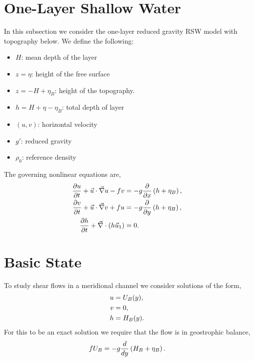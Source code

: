 \documentclass[letterpaper,10pt,english]{sphinxmanual}
\begin{document}
\section{One-Layer Shallow Water}
\label{linear_stability:one-layer-shallow-water}
In this subsection we consider the one-layer reduced gravity RSW model
with topography below. We define the following:
\begin{itemize}
\item {} 
\(H\): mean depth of the layer

\item {} 
\(z=\eta\): height of the free surface

\item {} 
\(z=-H + \eta_B\): height of the topography.

\item {} 
\(h = H + \eta - \eta_B\): total depth of layer

\item {} 
\((u,v)\): horizontal velocity

\item {} 
\(g'\): reduced gravity

\item {} 
\(\rho_0\): reference density

\end{itemize}

The governing nonlinear equations are,
\begin{gather}
\begin{split}\begin{aligned}
\frac{\partial u}{\partial t} + {\vec u} \cdot \vec \nabla u - f v &
= - g \frac{\partial}{\partial x} \left( h + \eta_B \right) , \\
 \frac{\partial v}{\partial t} + {\vec u} \cdot \vec \nabla v + f u &
= - g \frac{\partial}{\partial y} \left( h + \eta_B \right) , \\
\frac{\partial h}{\partial t} + \vec\nabla \cdot \left( h \vec u_1 \right) & = 0.\end{aligned}\end{split}\notag
\end{gather}

\section{Basic State}
\label{linear_stability:basic-state}
To study shear flows in a meridional channel we consider solutions of
the form,
\begin{gather}
\begin{split}\begin{aligned}
u & = U_B(y), \\
v & = 0,\\
h & = H_B(y).\end{aligned}\end{split}\notag
\end{gather}
For this to be an exact solution we require that the flow is in
geostrophic balance,
\begin{gather}
\begin{split}f U_B = - g \frac{d}{dy}\left( H_B + \eta_B \right).\end{split}\notag
\end{gather}
\end{document}
